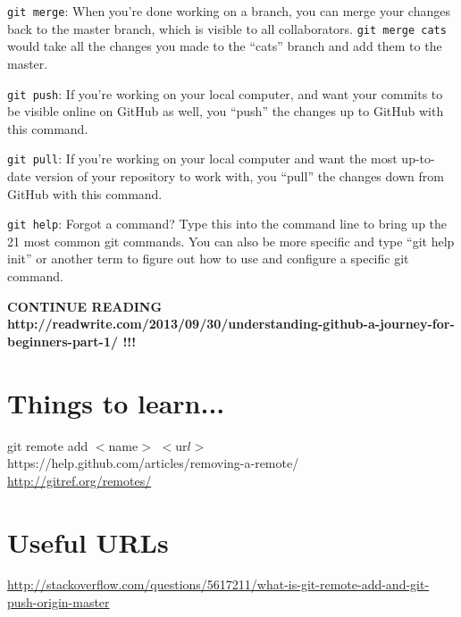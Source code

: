 \documentclass[11pt,a4paper]{article}
\begin{document}
{\tt git merge}: When you’re done working on a branch, you can merge
your changes back to the master branch, which is visible to all
collaborators. {\tt git merge cats} would take all the changes you
made to the ``cats'' branch and add them to the master.

{\tt git push}: If you’re working on your local computer, and want
your commits to be visible online on GitHub as well, you ``push'' the
changes up to GitHub with this command.

{\tt git pull}: If you’re working on your local computer and want the
most up-to-date version of your repository to work with, you ``pull''
the changes down from GitHub with this command.

{\tt git help}: Forgot a command? Type this into the command line to
bring up the 21 most common git commands. You can also be more
specific and type ``git help init'' or another term to figure out how
to use and configure a specific git command.

{\bf 
CONTINUE READING 
http://readwrite.com/2013/09/30/understanding-github-a-journey-for-beginners-part-1/
!!!
}
































\section{Things to learn...}
git remote add $<$name$>$ $<$ur$l>$\\

\noindent
https://help.github.com/articles/removing-a-remote/ \\

\noindent
\href{http://gitref.org/remotes/}{http://gitref.org/remotes/}\\


\section{Useful URLs}
\noindent
\href{http://stackoverflow.com/questions/5617211/what-is-git-remote-add-and-git-push-origin-master}{http://stackoverflow.com/questions/5617211/what-is-git-remote-add-and-git-push-origin-master}
\end{document}
